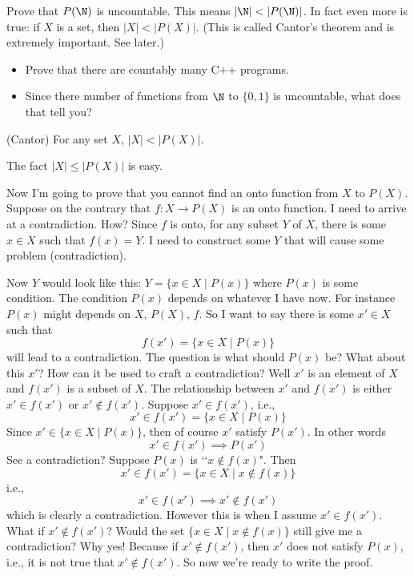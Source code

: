 \newpage
\begin{ex}
  Prove that $P(\N)$ is uncountable.
  This means $|\N| < |P(\N)|$.
  In fact even more is true:
  if $X$ is a set, then $|X| < |P(X)|$.
  (This is called Cantor's theorem and is extremely important.
  See later.)
\end{ex}


\newpage
\begin{ex}
  \mbox{}
 \begin{itemize}
 \item Prove that there are countably many C++ programs.
 \item Since there number of functions from $\N$ to $\{0,1\}$ is
  uncountable, what does that tell you?
 \end{itemize}
\end{ex}


\newpage
\begin{thm} \textnormal{(Cantor)}
For any set $X$, $|X| < |P(X)|$.
\end{thm}

The fact $|X| \leq |P(X)|$ is easy.

Now I'm going to prove that you cannot find an onto function
from $X$ to $P(X)$.
Suppose on the contrary that 
$f : X \rightarrow P(X)$ is an onto function.
I need to arrive at a contradiction.
How?
Since $f$ is onto,
for any subset $Y$ of $X$, there is some $x \in X$ such that
$f(x) = Y$.
I need to construct some $Y$ that will cause some problem (contradiction).

Now $Y$ would look like this:
$Y = \{x \in X \mid P(x)\}$ where $P(x)$ is some condition.
The condition $P(x)$ depends on whatever I have now.
For instance $P(x)$ might depends on $X$, $P(X)$, $f$.
So I want
to say there is some $x' \in X$ such that 
\[
f(x') = \{x \in X \mid P(x) \}
\]
will lead to a contradiction.
The question is what should $P(x)$ be?
What about this $x'$?
How can it be used to craft a contradiction?
Well $x'$ is an element of $X$
and $f(x')$ is a subset of $X$.
The relationship between $x'$ and $f(x')$ is
either $x' \in f(x')$ or $x' \not\in f(x')$.
Suppose $x' \in f(x')$, i.e.,
\[
x' \in f(x') = \{x \in X \mid P(x) \}
\]
Since $x' \in \{x \in X \mid P(x) \}$, then of course $x'$
satisfy $P(x')$.
In other words
\[
x' \in f(x') \implies P(x')
\]
See a contradiction? Suppose $P(x)$ is \lq\lq$x \not\in f(x)$".
Then
\[
x' \in f(x') = \{x \in X \mid x \not\in f(x) \}
\]
i.e.,
\[
x' \in f(x') \implies x' \not\in f(x')
\]
which is clearly a contradiction.
However this is when I assume $x' \in f(x')$.
What if $x' \not\in f(x')$?
Would the set 
$\{x \in X \mid x \not\in f(x) \}$ still give me a contradiction?
Why yes!
Because if $x' \not\in f(x')$, then $x'$ does not
satisfy $P(x)$, i.e., it is not true that
$x' \not\in f(x')$.
So now we're ready to write the proof.


